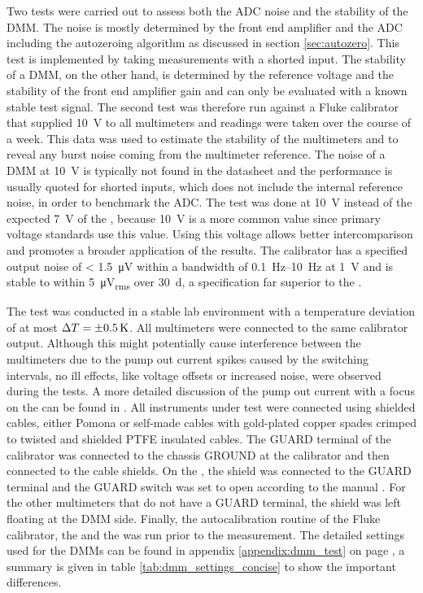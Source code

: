 Two tests were carried out to assess both the ADC noise and the stability of the DMM. The noise is mostly determined by the front end amplifier and the ADC including the autozeroing algorithm as discussed in section \ref{sec:autozero}. This test is implemented by taking measurements with a shorted input. The stability of a DMM, on the other hand, is determined by the reference voltage and the stability of the front end amplifier gain and can only be evaluated with a known stable test signal. The second test was therefore run against a Fluke  calibrator that supplied \qty{10}{\volt} to all multimeters and readings were taken over the course of a week. This data was used to estimate the stability of the multimeters and to reveal any burst noise coming from the multimeter reference. The noise of a DMM at \qty{10}{\volt} is typically not found in the datasheet and the performance is usually quoted for shorted inputs, which does not include the internal reference noise, in order to benchmark the ADC. The test was done at \qty{10}{\V} instead of the expected \qty{7}{\V} of the , because \qty{10}{\V} is a more common value since primary voltage standards use this value. Using this voltage allows better intercomparison and promotes a broader application of the results. The calibrator has a specified output noise of \qty{< 1.5}{\micro \volt} within a bandwidth of \qtyrange{0.1}{10}{\Hz} at \qty{1}{\volt} and is stable to within \qty{5}{\micro \volt_{rms}} over \qty{30}{\day}, a specification far superior to the .

The test was conducted in a stable lab environment with a temperature deviation of at most $\Delta T = \qty{\pm 0.5}{\kelvin}$. All multimeters were connected to the same calibrator output. Although this might potentially cause interference between the multimeters due to the pump out current spikes caused by the switching intervals, no ill effects, like voltage offsets or increased noise, were observed during the tests. A more detailed discussion of the pump out current with a focus on the  can be found in \cite{article_3458A_input_impedance}. All instruments under test were connected using shielded cables, either Pomona  or self-made cables with gold-plated copper spades crimped to twisted and shielded  PTFE insulated cables. The GUARD terminal of the calibrator was connected to the chassis GROUND at the calibrator and then connected to the cable shields. On the , the shield was connected to the GUARD terminal and the GUARD switch was set to open according to the manual \cite{manual_keysight3458a}. For the other multimeters that do not have a GUARD terminal, the shield was left floating at the DMM side. Finally, the autocalibration routine of the Fluke  calibrator, the  and the  was run prior to the measurement. The detailed settings used for the DMMs can be found in appendix \ref{appendix:dmm_test} on page \pageref{appendix:dmm_test}, a summary is given in table \ref{tab:dmm_settings_concise} to show the important differences.

